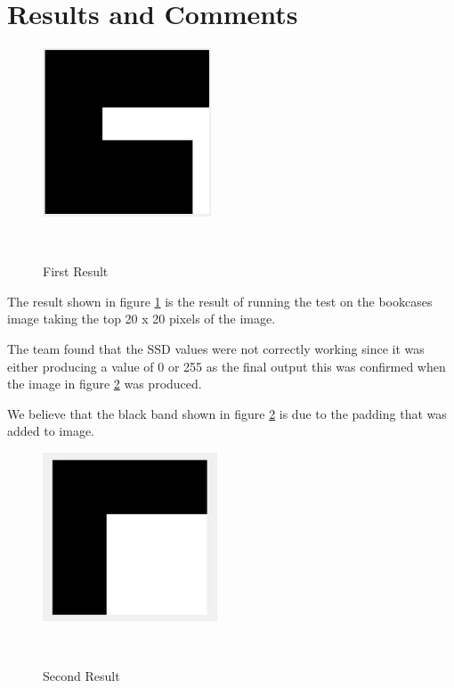 \documentclass[twocolumn]{article}
\begin{document}


\section{Results and Comments}
\vspace{-1ex}

 \begin{figure}[H]
\centering
  \includegraphics[height=50mm]{Figures/First_Result}
    \caption{First Result}~\label{fig:FirstResult}
\end{figure} 

The result shown in figure \ref{fig:FirstResult} is the result of running the test on the bookcases image taking the top 20 x 20 pixels of the image.  

The team found that the SSD values were not correctly working since it was either producing a value of 0 or 255 as the final output this was confirmed when the image in figure \ref{fig:SecondResult} was produced. 

We believe that the black band shown in figure \ref{fig:SecondResult} is due to the padding that was added to image. 

 \begin{figure}[H]
\centering
  \includegraphics[height=50mm]{Figures/Second_Result}
    \caption{Second Result}~\label{fig:SecondResult}
\end{figure} 
\end{document}
